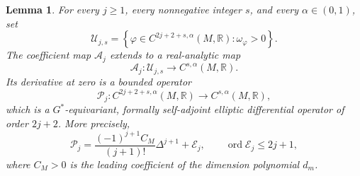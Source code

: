 \documentclass[11pt,reqno]{amsart}
\newtheorem{lemma}[theorem]{Lemma}
\theoremstyle{corollary}
\theoremstyle{conjecture}
\theoremstyle{assumption}
\theoremstyle{proposition}
\theoremstyle{remark}
\numberwithin{equation}{section}
\begin{document}
\begin{lemma}\label{lem:coefficient-analyticity}
For every $j\geq1$, every nonnegative integer $s$, and every $\alpha\in(0,1)$, set
\[
\mathcal U_{j,s}=\left\{\varphi\in C^{2j+2+s,\alpha}(M,\mathbb R)\colon\omega_\varphi>0\right\}.
\]
The coefficient map $\mathcal A_j$ extends to a real-analytic map
\[
\mathcal A_j\colon\mathcal U_{j,s}\longrightarrow C^{s,\alpha}(M,\mathbb R).
\]
Its derivative at zero is a bounded operator
\[
\mathcal P_j\colon C^{2j+2+s,\alpha}(M,\mathbb R)\longrightarrow C^{s,\alpha}(M,\mathbb R),
\]
which is a $G^*$-equivariant, formally self-adjoint elliptic differential operator of order $2j+2$. More precisely,
\begin{equation}\label{eq:linearized-coefficient-principal-part}
\mathcal P_j=\frac{(-1)^{j+1}C_M}{(j+1)!}\Delta^{j+1}+\mathcal E_j,\qquad \operatorname{ord}\mathcal E_j\leq 2j+1,
\end{equation}
where $C_M>0$ is the leading coefficient of the dimension polynomial $d_m$.
\end{lemma}
\end{document}
